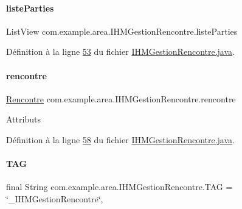 \paragraph{\texorpdfstring{liste\+Parties}{listeParties}}
{\footnotesize\ttfamily List\+View com.\+example.\+area.\+I\+H\+M\+Gestion\+Rencontre.\+liste\+Parties\hspace{0.3cm}{\ttfamily [private]}}



Définition à la ligne \hyperlink{_i_h_m_gestion_rencontre_8java_source_l00053}{53} du fichier \hyperlink{_i_h_m_gestion_rencontre_8java_source}{I\+H\+M\+Gestion\+Rencontre.\+java}.

\mbox{\label{classcom_1_1example_1_1area_1_1_i_h_m_gestion_rencontre_aa3ecacbd8ab104d2a3c3f3e727ae6c5c}} 
\paragraph{\texorpdfstring{rencontre}{rencontre}}
{\footnotesize\ttfamily \hyperlink{classcom_1_1example_1_1area_1_1_rencontre}{Rencontre} com.\+example.\+area.\+I\+H\+M\+Gestion\+Rencontre.\+rencontre\hspace{0.3cm}{\ttfamily [private]}}

Attributs 

Définition à la ligne \hyperlink{_i_h_m_gestion_rencontre_8java_source_l00058}{58} du fichier \hyperlink{_i_h_m_gestion_rencontre_8java_source}{I\+H\+M\+Gestion\+Rencontre.\+java}.

\mbox{\label{classcom_1_1example_1_1area_1_1_i_h_m_gestion_rencontre_a0ac4d9152d48619cd697c8c69166219f}} 
\paragraph{\texorpdfstring{T\+AG}{TAG}}
{\footnotesize\ttfamily final String com.\+example.\+area.\+I\+H\+M\+Gestion\+Rencontre.\+T\+AG = \char`\"{}\+\_\+\+I\+H\+M\+Gestion\+Rencontre\char`\"{}\hspace{0.3cm}{\ttfamily [static]}, {\ttfamily [private]}}



